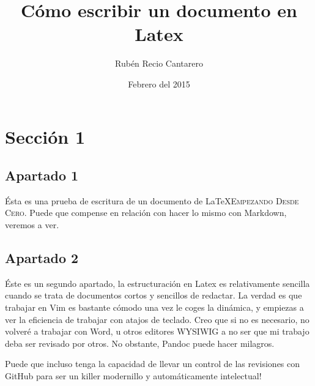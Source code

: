 \documentclass[11pt]{article}
\begin{document}
\title{Cómo escribir un documento en Latex}
\author{Rubén Recio Cantarero}
\date{Febrero del 2015}
\maketitle

\clearpage


\clearpage

\section{Sección 1}
\subsection{Apartado 1}

Ésta es una prueba de escritura de un documento de \LaTeX \textsc{Empezando Desde Cero}. Puede que compense en relación con hacer lo mismo con Markdown, veremos a ver.

\subsection{Apartado 2}
Éste es un segundo apartado, la estructuración en Latex es relativamente sencilla cuando se trata de documentos cortos y sencillos de redactar. La verdad es que trabajar en Vim es bastante cómodo una vez le coges la dinámica, y empiezas a ver la eficiencia de trabajar con atajos de teclado. Creo que si no es necesario, no volveré a trabajar con Word, u otros editores WYSIWIG a no ser que mi trabajo deba ser revisado por otros. No obstante, Pandoc puede hacer milagros.

Puede que incluso tenga la capacidad de llevar un control de las revisiones con GitHub para ser un killer modernillo y automáticamente intelectual!
\end{document}
